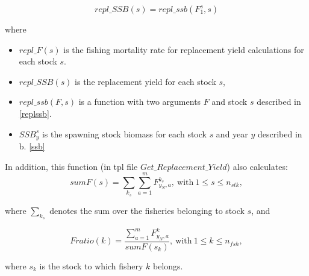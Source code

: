 \documentclass{article}
\begin{document}
\begin{equation}
    repl\_SSB(s) = repl\_ssb(F_1^s,s)
\end{equation}

where
\begin{itemize}
    \item $repl\_F(s)$ is the fishing mortality rate for replacement yield calculations for each stock $s$.
    
    \item $repl\_SSB(s)$ is the replacement yield for each stock $s$,
    
    \item $repl\_ssb(F,s)$ is a function with two arguments $F$ and stock $s$ described in  \ref{replssb}.
    \item $SSB^s_y$  is the spawning stock biomass for each stock $s$ and year $y$ described in b. \ref{ssb}

\end{itemize}

In addition, this function (in tpl file $Get\_Replacement\_Yield$) also calculates:
\begin{equation}
    sumF(s)=\sum_{k_s}\sum_{a=1}^m F^{k_s}_{y_N,a}, \  \text{with} \ 1\leq s \leq n_{stk},
\end{equation}

where $\displaystyle\sum_{k_s}$ denotes the sum over the fisheries belonging to stock $s$, and

\begin{equation} \label{fratio}
    Fratio(k)=\displaystyle\dfrac{\sum_{a=1}^mF^k_{y_N,a}}{sumF(s_k)}, \  \text{with} \ 1\leq k  \leq n_{fsh},
\end{equation}

where $s_k$ is the %
stock to which fishery $k$ belongs.

\end{document}

